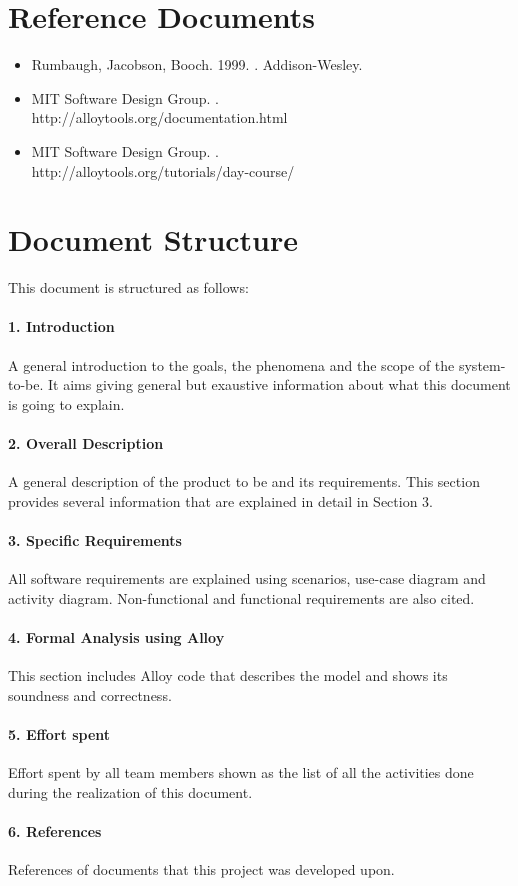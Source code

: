 \documentclass[../RASD.tex]{subfiles}
\begin{document}
		\section{Reference Documents}
		\begin{itemize}
		\item Rumbaugh, Jacobson, Booch. 1999. . Addison-Wesley.
		\item MIT Software Design Group. . \\http://alloytools.org/documentation.html
		\item MIT Software Design Group. . \\http://alloytools.org/tutorials/day-course/
		\end{itemize}
	
		\section{Document Structure}
		This document is structured as follows:
		\paragraph{1. Introduction}
		A general introduction to the goals, the phenomena and the scope of the system-to-be. It aims giving general but exaustive information about what this document is going to explain.
		\paragraph{2. Overall Description}
		A general description of the product to be and its requirements. This section provides several information that are explained in detail in Section 3.
		\paragraph{3. Specific Requirements}
		All software requirements are explained using scenarios, use-case diagram and activity diagram. Non-functional and functional requirements are also cited.
		\paragraph{4. Formal Analysis using Alloy}
		This section includes Alloy code that describes the model and shows its soundness and correctness.
		\paragraph{5. Effort spent}
		Effort spent by all team members shown as the list of all the activities done during the realization of this document.
		\paragraph{6. References}
		References of documents that this project was developed upon.

		
\end{document}
